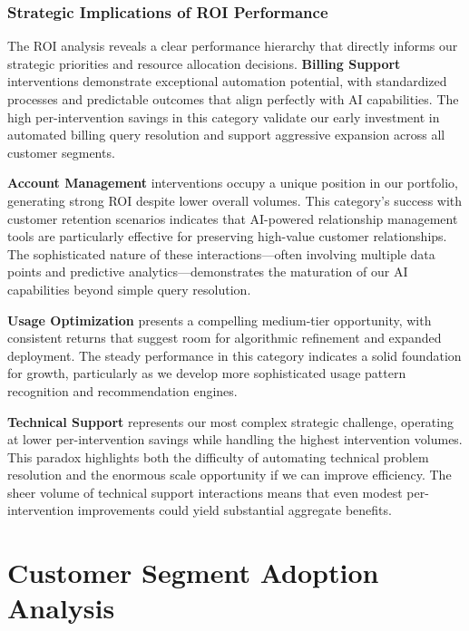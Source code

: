 \documentclass[
  letterpaper,
  DIV=11,
  numbers=noendperiod]{scrartcl}
\begin{document}
\subsubsection{Strategic Implications of ROI
Performance}\label{strategic-implications-of-roi-performance}

The ROI analysis reveals a clear performance hierarchy that directly
informs our strategic priorities and resource allocation decisions.
\textbf{Billing Support} interventions demonstrate exceptional
automation potential, with standardized processes and predictable
outcomes that align perfectly with AI capabilities. The high
per-intervention savings in this category validate our early investment
in automated billing query resolution and support aggressive expansion
across all customer segments.

\textbf{Account Management} interventions occupy a unique position in
our portfolio, generating strong ROI despite lower overall volumes. This
category's success with customer retention scenarios indicates that
AI-powered relationship management tools are particularly effective for
preserving high-value customer relationships. The sophisticated nature
of these interactions---often involving multiple data points and
predictive analytics---demonstrates the maturation of our AI
capabilities beyond simple query resolution.

\textbf{Usage Optimization} presents a compelling medium-tier
opportunity, with consistent returns that suggest room for algorithmic
refinement and expanded deployment. The steady performance in this
category indicates a solid foundation for growth, particularly as we
develop more sophisticated usage pattern recognition and recommendation
engines.

\textbf{Technical Support} represents our most complex strategic
challenge, operating at lower per-intervention savings while handling
the highest intervention volumes. This paradox highlights both the
difficulty of automating technical problem resolution and the enormous
scale opportunity if we can improve efficiency. The sheer volume of
technical support interactions means that even modest per-intervention
improvements could yield substantial aggregate benefits.

\section{Customer Segment Adoption
Analysis}\label{customer-segment-adoption-analysis}
\end{document}
